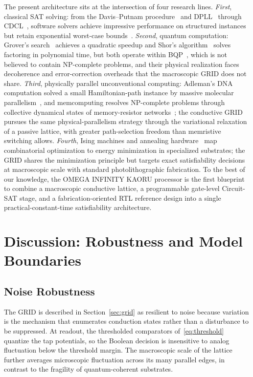 \documentclass[letterpaper,journal]{IEEEtran}
\begin{document}
The present architecture sits at the intersection of four research lines.
\emph{First}, classical SAT solving: from the Davis--Putnam
procedure~\cite{davis1960} and DPLL~\cite{davis1962} through
CDCL~\cite{marques1999,een2003}, software solvers achieve impressive
performance on structured instances but retain exponential worst-case
bounds~\cite{biere2009,arora2009}. \emph{Second}, quantum computation:
Grover's search~\cite{grover1996} achieves a quadratic speedup and Shor's
algorithm~\cite{shor1994} solves factoring in polynomial time, but both
operate within BQP~\cite{bernstein1997,nielsen2000}, which is not believed
to contain NP-complete problems, and their physical realization faces
decoherence and error-correction overheads that the macroscopic GRID does
not share. \emph{Third}, physically parallel unconventional computing:
Adleman's DNA computation solved a small Hamiltonian-path instance by
massive molecular parallelism~\cite{adleman1994}, and memcomputing resolves
NP-complete problems through collective dynamical states of
memory-resistor networks~\cite{traversa2015,diventra2018}; the conductive
GRID pursues the same physical-parallelism strategy through the variational
relaxation of a passive lattice, with greater path-selection freedom than
memristive switching allows. \emph{Fourth}, Ising machines and annealing
hardware~\cite{johnson2011,mohseni2022} map combinatorial optimization to
energy minimization in specialized substrates; the GRID shares the
minimization principle but targets exact satisfiability decisions at
macroscopic scale with standard photolithographic fabrication. To the best
of our knowledge, the OMEGA INFINITY KAORU processor is the first
blueprint to combine a macroscopic conductive lattice, a programmable
gate-level Circuit-SAT stage, and a fabrication-oriented RTL reference
design into a single practical-constant-time satisfiability architecture.

\section{Discussion: Robustness and Model Boundaries}
\label{sec:discussion}

\subsection{Noise Robustness}
The GRID is described in Section~\ref{sec:grid} as resilient to noise
because variation is the mechanism that enumerates conduction states
rather than a disturbance to be suppressed. At readout, the thresholded
comparators of~\eqref{eq:threshold} quantize the tap potentials, so the
Boolean decision is insensitive to analog fluctuation below the
threshold margin. The macroscopic scale of the lattice further averages
microscopic fluctuation across its many parallel edges, in contrast to
the fragility of quantum-coherent substrates.
\end{document}
